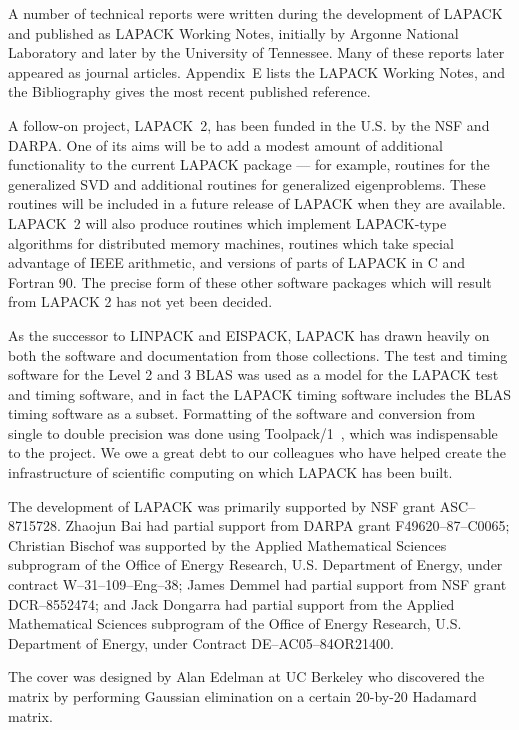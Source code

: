 A number of technical reports were written during the development of
LAPACK and published as LAPACK Working Notes, initially by Argonne
National Laboratory and later by the University of Tennessee.
Many of these reports later appeared as journal articles. 
Appendix~E lists the LAPACK Working Notes,
and the Bibliography gives the
most recent published reference.

A follow-on project, LAPACK~2, has been funded in the U.S. by the NSF
and DARPA.
One of its aims will be to add a modest amount of additional
functionality to the current LAPACK package --- for example, 
routines for the generalized SVD and additional routines for 
generalized eigenproblems. These routines will be included in a future
release of LAPACK when they are available.
LAPACK~2 will also produce routines which implement LAPACK-type
algorithms for distributed memory machines, routines which take special 
advantage of IEEE arithmetic, and versions of parts of LAPACK in
C and Fortran 90.
The precise form of these other software packages which will
result from LAPACK 2 has not yet been decided.

As the successor to LINPACK and EISPACK, LAPACK has drawn
heavily on both the software and documentation from those collections.
The test and timing software for the Level 2 and 3 BLAS was
used as a model for the LAPACK test and timing software, and in
fact the LAPACK timing software includes the BLAS timing software
as a subset.
Formatting of the software and conversion from single to double
precision was done using Toolpack/1~\cite{Toolpack}, which was
indispensable to the project.
We owe a great debt to our colleagues
who have helped create the infrastructure of scientific computing on
which LAPACK has been built.

The development of LAPACK was primarily supported by NSF grant 
ASC--8715728. 
Zhaojun Bai
had partial support from DARPA grant F49620--87--C0065;
Christian Bischof was supported by the Applied
Mathematical Sciences subprogram of the Office of Energy Research,
U.S. Department of Energy, under contract W--31--109--Eng--38; James
Demmel had partial support from NSF grant DCR--8552474;
and
Jack Dongarra had partial support from the
Applied Mathematical Sciences subprogram
of the Office of Energy Research, U.S.
Department of Energy, under Contract
DE--AC05--84OR21400.

The cover was designed by Alan Edelman at UC Berkeley who discovered the matrix
by performing Gaussian elimination on a certain 20-by-20 Hadamard matrix.


